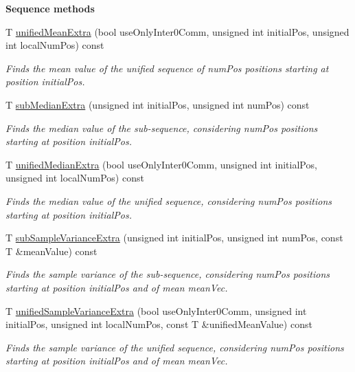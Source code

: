 \begin{Indent}{\bf Sequence methods}
\begin{DoxyCompactItemize}
T \hyperlink{class_q_u_e_s_o_1_1_scalar_sequence_ab0b289927919fe9d3a4446ce3433c137}{unified\-Mean\-Extra} (bool use\-Only\-Inter0\-Comm, unsigned int initial\-Pos, unsigned int local\-Num\-Pos) const 
\begin{DoxyCompactList}\small\item\em Finds the mean value of the unified sequence of {\ttfamily num\-Pos} positions starting at position {\ttfamily initial\-Pos}. \end{DoxyCompactList}\item 
T \hyperlink{class_q_u_e_s_o_1_1_scalar_sequence_a512b168f530aeb607c8a86d4f8b7b889}{sub\-Median\-Extra} (unsigned int initial\-Pos, unsigned int num\-Pos) const 
\begin{DoxyCompactList}\small\item\em Finds the median value of the sub-\/sequence, considering {\ttfamily num\-Pos} positions starting at position {\ttfamily initial\-Pos}. \end{DoxyCompactList}\item 
T \hyperlink{class_q_u_e_s_o_1_1_scalar_sequence_ad0a44d5268efa8d6a15baa30cd1f93ca}{unified\-Median\-Extra} (bool use\-Only\-Inter0\-Comm, unsigned int initial\-Pos, unsigned int local\-Num\-Pos) const 
\begin{DoxyCompactList}\small\item\em Finds the median value of the unified sequence, considering {\ttfamily num\-Pos} positions starting at position {\ttfamily initial\-Pos}. \end{DoxyCompactList}\item 
T \hyperlink{class_q_u_e_s_o_1_1_scalar_sequence_a96aa7ad157eb648ffd65f99008609200}{sub\-Sample\-Variance\-Extra} (unsigned int initial\-Pos, unsigned int num\-Pos, const T \&mean\-Value) const 
\begin{DoxyCompactList}\small\item\em Finds the sample variance of the sub-\/sequence, considering {\ttfamily num\-Pos} positions starting at position {\ttfamily initial\-Pos} and of mean {\ttfamily mean\-Vec}. \end{DoxyCompactList}\item 
T \hyperlink{class_q_u_e_s_o_1_1_scalar_sequence_a132654b8d4d733f77c37b868c9c9684a}{unified\-Sample\-Variance\-Extra} (bool use\-Only\-Inter0\-Comm, unsigned int initial\-Pos, unsigned int local\-Num\-Pos, const T \&unified\-Mean\-Value) const 
\begin{DoxyCompactList}\small\item\em Finds the sample variance of the unified sequence, considering {\ttfamily num\-Pos} positions starting at position {\ttfamily initial\-Pos} and of mean {\ttfamily mean\-Vec}. \end{DoxyCompactList}\item 

\end{DoxyCompactItemize}
\end{Indent}
